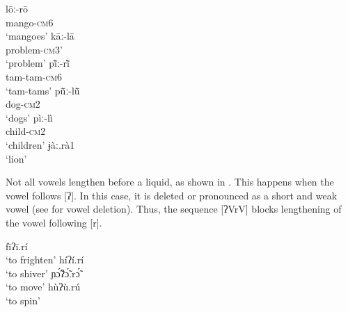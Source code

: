 \documentclass[output=paper]{langscibook}
\begin{document}
\pagebreak 
 \begin{exe}
     \ex \label{ex:traore:vowelLengtheningExamples:9}
     \begin{multicols}{2}
        \begin{xlist}
            \ex \gll lōː-rō\\
            mango-\textsc{cm}6\\
            \trans `mangoes'
            \ex \gll kāː-lā\\
            problem-\textsc{cm}3'\\
            \trans `problem'
            \ex \gll pĩ̀ː-rĩ̀   \\
            tam-tam-\textsc{cm}6\\
            \trans `tam-tams'
            \columnbreak
            \ex \gll pũ̄ː-lũ̄ \\
            dog-\textsc{cm}2\\
            \trans `dogs'
            \ex \gll pìː-lì\\
            child-\textsc{cm}2\\
            `children'
            \ex  ɉàː.rà1   \label{ex:traore:vowelLengtheningExamples:9f}\\
            `lion'
        \end{xlist}
     \end{multicols}
 \end{exe}
 
Not all vowels lengthen before a liquid, as shown in . This happens when the vowel follows [ʔ]. In this case, it is deleted or pronounced as a short and weak vowel (see 
 for vowel deletion). Thus, the sequence [ʔVrV] blocks lengthening of the vowel following [r]. 

 \begin{exe}
    \ex \label{ex:traore:lackOfVowelLengthening:10}
    \begin{multicols}{2}
        \begin{xlist}
            \ex fīʔī.rí\\
            `to frighten'
            \ex  híʔí.rí\\
            `to shiver'
            \columnbreak
            \ex ɲɔ̃́ʔɔ̃́.rɔ̃́\\
            `to move'
            \ex hùʔù.rú\\
            `to spin'
        \end{xlist}
    \end{multicols}
 \end{exe}
\end{document}
